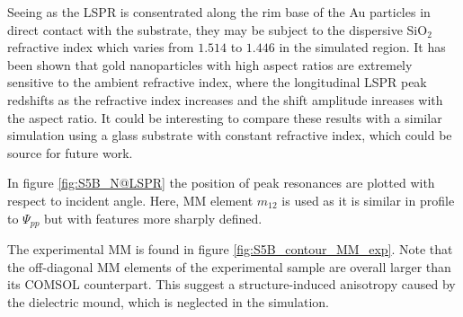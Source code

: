 Seeing as the LSPR is consentrated along the rim base of the Au particles in direct contact with the substrate, they may be subject to the dispersive SiO$_2$ refractive index which varies from $1.514$ to $1.446$ in the simulated region. It has been shown that gold nanoparticles with high aspect ratios are extremely sensitive to the ambient refractive index, where the longitudinal LSPR peak redshifts as the refractive index increases and the shift amplitude inreases with the aspect ratio\cite{LSPR_sensor_review}\cite{Au_nanorods_review}. It could be interesting to compare these results with a similar simulation using a glass substrate with constant refractive index, which could be source for future work.

In figure \ref{fig:S5B_N@LSPR} the position of peak resonances are plotted with respect to incident angle. Here, MM element $m_{12}$ is used as it is similar in profile to $\Psi_{pp}$ but with features more sharply defined.

The experimental MM is found in figure \ref{fig:S5B_contour_MM_exp}. Note that the off-diagonal MM elements of the experimental sample are overall larger than its COMSOL counterpart. This suggest a structure-induced anisotropy caused by the dielectric mound, which is neglected in the simulation.



